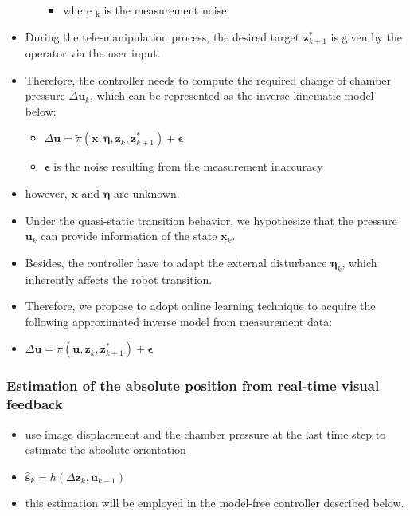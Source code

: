 \documentclass[journal,onecolumn]{IEEEtran}
\begin{document}
\begin{itemize}
\begin{itemize}
\begin{itemize}
\item where \bm{\epsilon}\(_{\text{k}}\) is the measurement noise
\end{itemize}
\end{itemize}
\item During the tele-manipulation process, the desired target \(\bm{z}_{k+1}^*\) is given by the operator via the user input.
\item Therefore, the controller needs to compute the required change of chamber pressure \(\Delta \bm{u}_k\), which can be represented as the inverse kinematic model below:
\begin{itemize}
\item \(\Delta \bm{u}=\tilde \pi(\bm{x}, \bm{\eta}, \bm{z}_k, \bm{z}_{k+1}^{*}) + \bm{\epsilon}\)
\item \(\bm{\epsilon}\) is the noise resulting from the measurement inaccuracy
\end{itemize}
\item however, \(\bm{x}\) and \(\bm{\eta}\) are unknown.
\item Under the quasi-static transition behavior, we hypothesize that the pressure \(\bm{u}_k\) can provide information of the state \(\bm{x}_k\).
\item Besides, the controller have to adapt the external disturbance \(\bm{\eta}_k\), which inherently affects the robot transition.
\item Therefore, we propose to adopt online learning technique to acquire the following approximated inverse model from measurement data:
\item \(\Delta \bm{u}= \pi(\bm{u}, \bm{z}_k, \bm{z}_{k+1}^{*}) + \bm{\epsilon}\)
\end{itemize}

\subsubsection{Estimation of the absolute position from real-time visual feedback}
\label{sec:org26c53ef}
\begin{itemize}
\item use image displacement and the chamber pressure at the last time step to estimate the absolute orientation
\item \(\bm{\hat s}_k = h(\Delta \bm{z}_k,\bm{u}_{k-1})\)
\item this estimation will be employed in the model-free controller described below.
\end{itemize}
\end{document}
